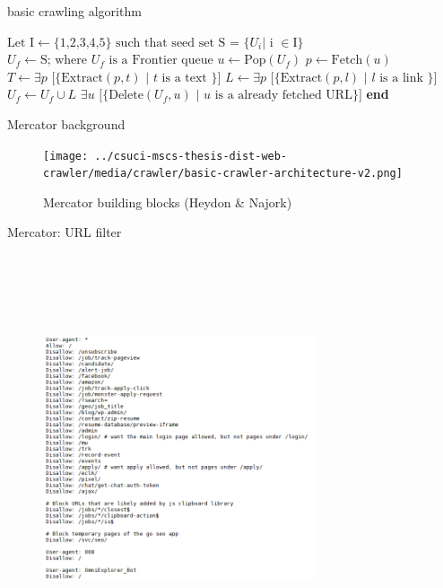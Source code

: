 \documentclass[9pt]{beamer}
\begin{document}
\begin{frame}{basic crawling algorithm}
  \begin{algorithm}[H]
    \begin{algorithmic}[1]
      \State $\text{Let I} \gets \text{\{1,2,3,4,5\}} \text{ such that seed set S = \{} U_i \text{| i } \in \text{I\}}$
      \State $U_f \gets \text{S; where } U_f \text{ is a Frontier queue}$
      \State $u \gets \text{Pop}(U_f)$ 
      \State $p \gets \text{Fetch}(u)$
      \State $T \gets \exists p\text{ [\{Extract}(p, t) \text{ | } t \text{ is a text \}]}$
      \State $L \gets \exists p\text{ [\{Extract}(p, l) \text{ | } l \text{ is a link \}]}$
      \State $U_f \gets U_f \cup L$
      \State $\exists u\text{ [\{Delete}(U_f, u) \text{ | } u \text{ is a already fetched URL\}]}$
      \EndWhile
      \EndProcedure
      \State \textbf{end}
    \end{algorithmic}
  \end{algorithm}
\end{frame}


\begin{frame}{Mercator background}
  \centering
  \begin{figure}
  \texttt{[image: ../csuci-mscs-thesis-dist-web-crawler/media/crawler/basic-crawler-architecture-v2.png]}
  \caption{Mercator building blocks (Heydon \& Najork)}
  \end{figure}
\end{frame}


\begin{frame}{Mercator: URL filter}
  \centering
  \begin{figure}
  \includegraphics[width=8cm, height=12cm, keepaspectratio]{img/robots.png}
  \end{figure}
\end{frame}
\end{document}
